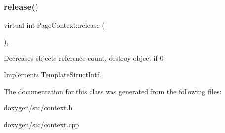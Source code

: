 \subsubsection{\texorpdfstring{release()}{release()}}
{\footnotesize\ttfamily virtual int Page\+Context\+::release (\begin{DoxyParamCaption}{ }\end{DoxyParamCaption})\hspace{0.3cm}{\ttfamily [inline]}, {\ttfamily [virtual]}}

Decreases object\textquotesingle{}s reference count, destroy object if 0 

Implements \mbox{\hyperlink{class_template_struct_intf_a3dce7dd29d3f66a8080b40578e8a5045}{Template\+Struct\+Intf}}.



The documentation for this class was generated from the following files\+:\begin{DoxyCompactItemize}
\item 
doxygen/src/context.\+h\item 
doxygen/src/context.\+cpp\end{DoxyCompactItemize}
